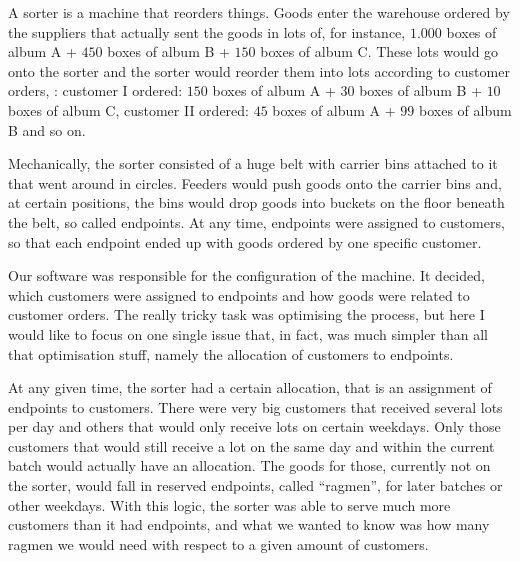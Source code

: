 \documentclass{scrreprt}
\begin{document}
A sorter is a machine that reorders things.
Goods enter the warehouse ordered by the suppliers
that actually sent the goods in lots of, for instance, 
$ \num{1,000}$ boxes of album A
+ $\num{450}$ boxes of album B
+ $\num{150}$ boxes of album C.
These lots would go onto the sorter
and the sorter would reorder them into
lots according to customer orders,
\eg: customer I ordered:
    $\num{150}$ boxes of album A
  + $\num{30}$  boxes of album B 
  + $\num{10}$  boxes of album C,
customer II ordered: 
    $\num{45}$  boxes of album A
  + $\num{99}$  boxes of album B
and so on. 

Mechanically, the sorter consisted
of a huge belt with 
carrier bins attached to it
that went around in circles.
Feeders would push goods onto the carrier bins
and, at certain positions,
the bins would drop goods into buckets
on the floor beneath the belt, so called endpoints.
At any time, endpoints were assigned
to customers, so that each endpoint
ended up with goods ordered by one specific customer.

Our software was responsible for the 
configuration of the machine.
It decided, which customers were assigned
to endpoints and how goods were related to customer orders.
The really tricky task was optimising the process,
but here I would like to focus on one single
issue that, in fact, was much simpler than all
that optimisation stuff, namely
the allocation of customers to endpoints.

At any given time, 
the sorter had a certain allocation,
that is an assignment of endpoints to customers.
There were very big customers
that received several lots per day and
others that would only receive lots on certain weekdays.
Only those customers that would still receive
a lot on the same day and within the current batch 
would actually have
an allocation. The goods for those, 
currently not on the sorter,
would fall in reserved endpoints, 
called ``ragmen'', for later batches
or other weekdays.
With this logic, the sorter was able to serve
much more customers than it had endpoints,
and what we wanted to know was
how many ragmen we would need
with respect to a given amount of customers. 
\end{document}
